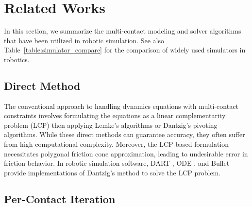 \section{Related Works}
\label{sec:relatedworks}

In this section, we summarize the multi-contact modeling and solver algorithms that have been utilized in robotic simulation. See also Table~\ref{table:simulator_compare} for the comparison of widely used simulators in robotics.

\subsection{Direct Method}
The conventional approach to handling dynamics equations with multi-contact constraints involves formulating the equations as a linear complementarity problem (LCP) \cite{potra1997formulating} then applying Lemke's algorithms \cite{llyod2005fast} or Dantzig's pivoting algorithms. 
While these direct methods can guarantee accuracy, they often suffer from high computational complexity. Moreover, the LCP-based formulation necessitates polygonal friction cone approximation, leading to undesirable error in friction behavior. 
In robotic simulation software, DART \cite{lee2018dart}, ODE \cite{ode}, and Bullet \cite{bullet} provide implementations of Dantzig's method to solve the LCP problem.

\subsection{Per-Contact Iteration}

